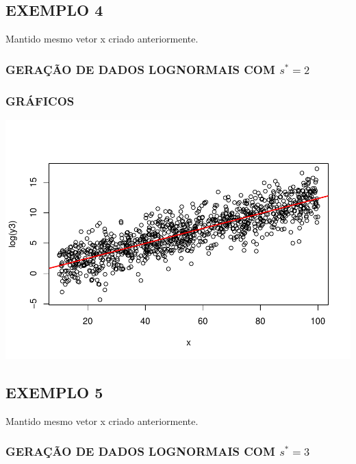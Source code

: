 \documentclass[]{article}
\begin{document}
\subsection{EXEMPLO 4}\label{exemplo-4}

Mantido mesmo vetor x criado anteriormente.

\subsubsection{\texorpdfstring{GERAÇÃO DE DADOS LOGNORMAIS COM
\(s^* = 2\)}{GERAÇÃO DE DADOS LOGNORMAIS COM s\^{}* = 2}}\label{geracao-de-dados-lognormais-com-s-2}

\subsubsection{GRÁFICOS}\label{graficos-3}

\includegraphics{Impacto_sigma_files/figure-latex/unnamed-chunk-13-1.pdf}

\subsection{EXEMPLO 5}\label{exemplo-5}

Mantido mesmo vetor x criado anteriormente.

\subsubsection{\texorpdfstring{GERAÇÃO DE DADOS LOGNORMAIS COM
\(s^* = 3\)}{GERAÇÃO DE DADOS LOGNORMAIS COM s\^{}* = 3}}\label{geracao-de-dados-lognormais-com-s-3}
\end{document}
